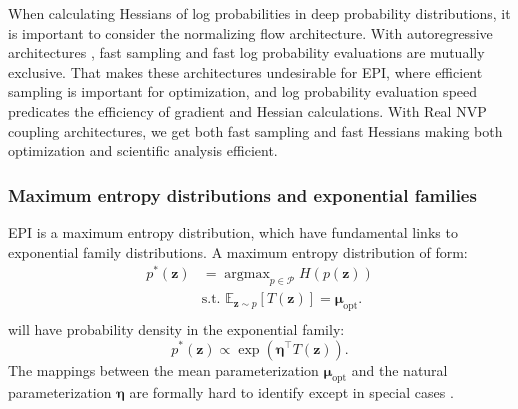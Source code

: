 \documentclass[11pt]{article}
\DeclareMathOperator*{\argmax}{argmax}
\begin{document}
When calculating Hessians of log probabilities in deep probability distributions, it is important to consider the normalizing flow architecture.
With autoregressive architectures \cite{kingma2016improved, papamakarios2017masked}, fast sampling and fast log probability evaluations are mutually exclusive.
That makes these architectures undesirable for EPI, where efficient sampling is important for optimization, and log probability evaluation speed predicates the efficiency of gradient and Hessian calculations.
With Real NVP coupling architectures, we get both fast sampling and fast Hessians making both optimization and scientific analysis efficient.

\subsubsection{Maximum entropy distributions and exponential families}\label{methods_ME_EF}
EPI is a maximum entropy distribution, which have fundamental links to exponential family distributions. 
A maximum entropy distribution of form:
\begin{equation} \label{eq:max_ent}
\begin{split}
p^*(\mathbf{z}) &= \argmax_{p \in \mathcal{P}} H(p(\mathbf{z})) \\
 &  \text{s.t.  } \mathbb{E}_{\mathbf{z} \sim p}\left[T(\mathbf{z})\right] = \bm{\mu}_{\text{opt}}. \\
 \end{split}
\end{equation} 
will have probability density in the exponential family:
\begin{equation}
p^*(\mathbf{z}) \propto \exp(\bm{\eta}^\top T(\textbf{z})).
\end{equation}
The mappings between the mean parameterization $\bm{\mu}_{\text{opt}}$ and the natural parameterization $\bm{\eta}$ are formally hard to identify except in special cases \cite{wainwright2008graphical}.
\end{document}
